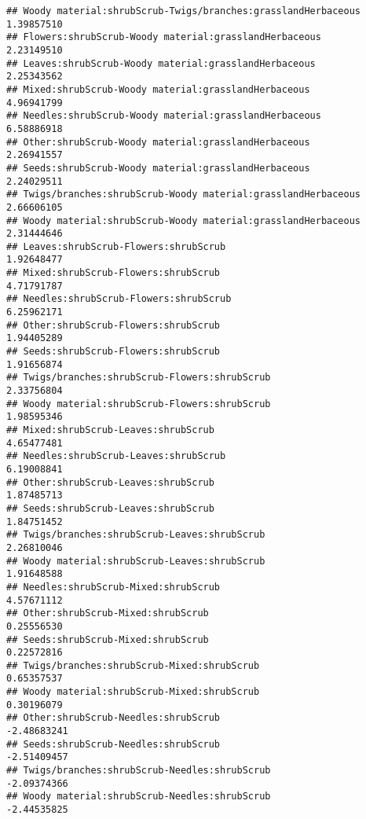 \documentclass[
]{article}
\begin{document}
\begin{verbatim}
## Woody material:shrubScrub-Twigs/branches:grasslandHerbaceous           1.39857510
## Flowers:shrubScrub-Woody material:grasslandHerbaceous                  2.23149510
## Leaves:shrubScrub-Woody material:grasslandHerbaceous                   2.25343562
## Mixed:shrubScrub-Woody material:grasslandHerbaceous                    4.96941799
## Needles:shrubScrub-Woody material:grasslandHerbaceous                  6.58886918
## Other:shrubScrub-Woody material:grasslandHerbaceous                    2.26941557
## Seeds:shrubScrub-Woody material:grasslandHerbaceous                    2.24029511
## Twigs/branches:shrubScrub-Woody material:grasslandHerbaceous           2.66606105
## Woody material:shrubScrub-Woody material:grasslandHerbaceous           2.31444646
## Leaves:shrubScrub-Flowers:shrubScrub                                   1.92648477
## Mixed:shrubScrub-Flowers:shrubScrub                                    4.71791787
## Needles:shrubScrub-Flowers:shrubScrub                                  6.25962171
## Other:shrubScrub-Flowers:shrubScrub                                    1.94405289
## Seeds:shrubScrub-Flowers:shrubScrub                                    1.91656874
## Twigs/branches:shrubScrub-Flowers:shrubScrub                           2.33756804
## Woody material:shrubScrub-Flowers:shrubScrub                           1.98595346
## Mixed:shrubScrub-Leaves:shrubScrub                                     4.65477481
## Needles:shrubScrub-Leaves:shrubScrub                                   6.19008841
## Other:shrubScrub-Leaves:shrubScrub                                     1.87485713
## Seeds:shrubScrub-Leaves:shrubScrub                                     1.84751452
## Twigs/branches:shrubScrub-Leaves:shrubScrub                            2.26810046
## Woody material:shrubScrub-Leaves:shrubScrub                            1.91648588
## Needles:shrubScrub-Mixed:shrubScrub                                    4.57671112
## Other:shrubScrub-Mixed:shrubScrub                                      0.25556530
## Seeds:shrubScrub-Mixed:shrubScrub                                      0.22572816
## Twigs/branches:shrubScrub-Mixed:shrubScrub                             0.65357537
## Woody material:shrubScrub-Mixed:shrubScrub                             0.30196079
## Other:shrubScrub-Needles:shrubScrub                                   -2.48683241
## Seeds:shrubScrub-Needles:shrubScrub                                   -2.51409457
## Twigs/branches:shrubScrub-Needles:shrubScrub                          -2.09374366
## Woody material:shrubScrub-Needles:shrubScrub                          -2.44535825

\end{verbatim}
\end{document}
